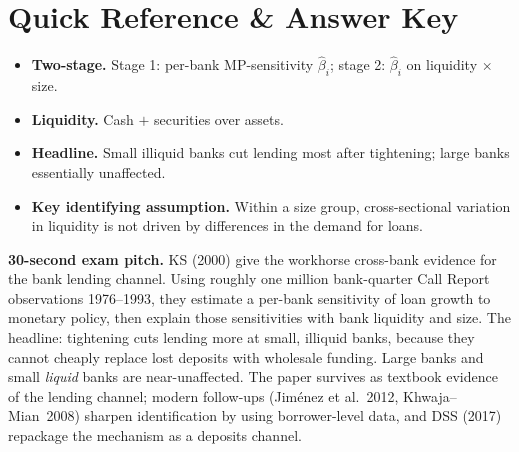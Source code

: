 \documentclass[11pt]{article}
\begin{document}
\section*{Quick Reference \& Answer Key}
\begin{answerbox}
\begin{itemize}
\item \textbf{Two-stage.} Stage 1: per-bank MP-sensitivity $\hat\beta_i$; stage 2: $\hat\beta_i$ on liquidity $\times$ size.
\item \textbf{Liquidity.} Cash $+$ securities over assets.
\item \textbf{Headline.} Small illiquid banks cut lending most after tightening; large banks essentially unaffected.
\item \textbf{Key identifying assumption.} Within a size group, cross-sectional variation in liquidity is not driven by differences in the demand for loans.
\end{itemize}
\end{answerbox}

\begin{keybox}
\textbf{30-second exam pitch.} KS (2000) give the workhorse cross-bank evidence for the bank lending channel. Using roughly one million bank-quarter Call Report observations 1976--1993, they estimate a per-bank sensitivity of loan growth to monetary policy, then explain those sensitivities with bank liquidity and size. The headline: tightening cuts lending more at small, illiquid banks, because they cannot cheaply replace lost deposits with wholesale funding. Large banks and small \emph{liquid} banks are near-unaffected. The paper survives as textbook evidence of the lending channel; modern follow-ups (Jim\'enez et al.~2012, Khwaja--Mian~2008) sharpen identification by using borrower-level data, and DSS (2017) repackage the mechanism as a deposits channel.
\end{keybox}
\end{document}
